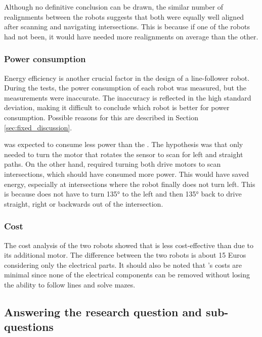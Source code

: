 Although no definitive conclusion can be drawn, the similar number of realignments between the robots suggests that both were equally well aligned after scanning and navigating intersections. This is because if one of the robots had not been, it would have needed more realignments on average than the other.


\subsubsection{Power consumption} \label{sec:power_consumption}
Energy efficiency is another crucial factor in the design of a line-follower robot. During the tests, the power consumption of each robot was measured, but the measurements were inaccurate. The inaccuracy is reflected in the high standard deviation, making it difficult to conclude which robot is better for power consumption. Possible reasons for this are described in Section \ref{sec:fixed_discussion}.

\TurnRob was expected to consume less power than the \FixRob. The hypothesis was that \TurnRob only needed to turn the motor that rotates the sensor to scan for left and straight paths. On the other hand, \FixRob required turning both drive motors to scan intersections, which should have consumed more power. This would have saved \TurnRob energy, especially at intersections where the robot finally does not turn left. This is because \TurnRob does not have to turn 135° to the left and then 135° back to drive straight, right or backwards out of the intersection.


\subsubsection{Cost}
The cost analysis of the two robots showed that \TurnRob is less cost-effective than \FixRob due to its additional motor. The difference between the two robots is about 15 Euros considering only the electrical parts. It should also be noted that \FixRob's costs are minimal since none of the electrical components can be removed without losing the ability to follow lines and solve mazes.

\subsection{Answering the research question and sub-questions}

